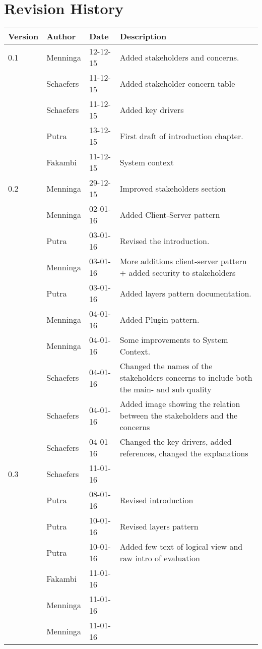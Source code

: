 \section*{Revision History}
\begin{longtable}{L{} L{} L{} L{}}
	\textbf{Version} & \textbf{Author}       & \textbf{Date} & \textbf{Description}                                                                                                                                                                                                       \\ \endhead	\toprule
				0.1 & Menninga  & 12-12-15 & Added stakeholders and concerns. \\
					& Schaefers & 11-12-15 & Added stakeholder concern table\\
					& Schaefers & 11-12-15 & Added key drivers\\
					& Putra		& 13-12-15 & First draft of introduction chapter. \\
					& Fakambi   & 11-12-15 & System context\\
				\midrule
			
				0.2 & Menninga  & 29-12-15 & Improved stakeholders section \\
					& Menninga  & 02-01-16 & Added Client-Server pattern \\
					& Putra		& 03-01-16 & Revised the introduction. \\
					& Menninga  & 03-01-16 & More additions client-server pattern + added security to stakeholders \\
					& Putra		& 03-01-16 & Added layers pattern documentation. \\
					& Menninga	& 04-01-16 & Added Plugin pattern. \\
					& Menninga  & 04-01-16 & Some improvements to System Context. \\
					& Schaefers & 04-01-16 & Changed the names of the stakeholders concerns to include both the main- and sub quality \\
					& Schaefers & 04-01-16 & Added image showing the relation between the stakeholders and the concerns \\
					& Schaefers & 04-01-16 & Changed the key drivers, added references, changed the explanations \\
				\midrule


				0.3 & Schaefers & 11-01-16 & \\
					& Putra		& 08-01-16 & Revised introduction \\
					& Putra		& 10-01-16 & Revised layers pattern \\
					& Putra		& 10-01-16 & Added few text of logical view and raw intro of evaluation \\
					& Fakambi   & 11-01-16 & \\
					& Menninga  & 11-01-16 & \\
					& Menninga  & 11-01-16 & \\
				\midrule


\end{longtable}
